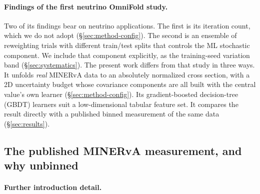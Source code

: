 \paragraph{Findings of the first neutrino OmniFold study.} Two of its findings bear on neutrino applications. The first is its iteration count, which we do not adopt (\S\ref{sec:method-config}). The second is an ensemble of reweighting trials with different train/test splits that controls the ML stochastic component. We include that component explicitly, as the training-seed variation band (\S\ref{sec:systematics}). The present work differs from that study in three ways. It unfolds \emph{real} MINERvA data to an absolutely normalized cross section, with a 2D uncertainty budget whose covariance components are all built with the central value's own learner (\S\ref{sec:method-config}). Its gradient-boosted decision-tree (GBDT) learners suit a low-dimensional tabular feature set. It compares the result directly with a published binned measurement of the same data (\S\ref{sec:results}).

\subsection{The published MINERvA measurement, and why unbinned}\label{recsec:intro-measurement}

\paragraph{Further introduction detail.}

